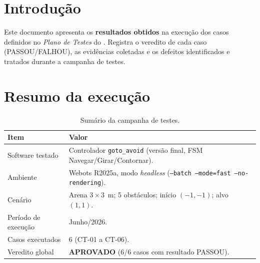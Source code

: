 
\newcommand{\tipodoc}{Protocolo de Testes}
\newcommand{\datadoc}{30 de junho de 2026}


\fazcapa
\controleversoes
\tableofcontents
\newpage

\section{Introdução}
Este documento apresenta os \textbf{resultados obtidos} na execução dos casos definidos no \emph{Plano de Testes} do \emph{\projnome}. Registra o veredito de cada caso (PASSOU/FALHOU), as evidências coletadas e os defeitos identificados e tratados durante a campanha de testes.

\section{Resumo da execução}
\begin{table}[H]\centering
\caption{Sumário da campanha de testes.}
\begin{tabularx}{\textwidth}{@{}l X@{}}
\toprule
\textbf{Item} & \textbf{Valor} \\
\midrule
Software testado & Controlador \texttt{goto\_avoid} (versão final, FSM Navegar/Girar/Contornar). \\
Ambiente & Webots R2025a, modo \emph{headless} (\texttt{--batch --mode=fast --no-rendering}). \\
Cenário & Arena $3\times3$~m; 5 obstáculos; início $(-1,-1)$; alvo $(1,1)$. \\
Período de execução & Junho/2026. \\
Casos executados & 6 (CT-01 a CT-06). \\
Veredito global & \textbf{APROVADO} (6/6 casos com resultado PASSOU). \\
\bottomrule
\end{tabularx}
\end{table}

